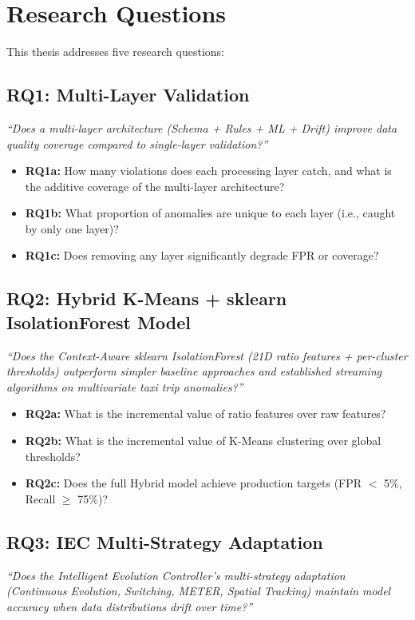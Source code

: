 \section{Research Questions}

This thesis addresses five research questions:

\subsection{RQ1: Multi-Layer Validation}
\textit{``Does a multi-layer architecture (Schema + Rules + ML + Drift) improve data quality coverage compared to single-layer validation?''}

\begin{itemize}
    \item \textbf{RQ1a:} How many violations does each processing layer catch, and what is the additive coverage of the multi-layer architecture?
    \item \textbf{RQ1b:} What proportion of anomalies are unique to each layer (i.e., caught by only one layer)?
    \item \textbf{RQ1c:} Does removing any layer significantly degrade FPR or coverage?
\end{itemize}

\subsection{RQ2: Hybrid K-Means + sklearn IsolationForest Model}
\textit{``Does the Context-Aware sklearn IsolationForest (21D ratio features + per-cluster thresholds) outperform simpler baseline approaches and established streaming algorithms on multivariate taxi trip anomalies?''}

\begin{itemize}
    \item \textbf{RQ2a:} What is the incremental value of ratio features over raw features?
    \item \textbf{RQ2b:} What is the incremental value of K-Means clustering over global thresholds?
    \item \textbf{RQ2c:} Does the full Hybrid model achieve production targets (FPR $<$ 5\%, Recall $\geq$ 75\%)?
\end{itemize}

\subsection{RQ3: IEC Multi-Strategy Adaptation}
\textit{``Does the Intelligent Evolution Controller's multi-strategy adaptation (Continuous Evolution, Switching, METER, Spatial Tracking) maintain model accuracy when data distributions drift over time?''}

